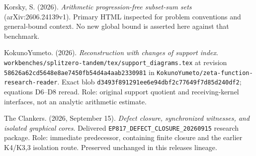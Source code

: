 Korsky, S. (2026). \emph{Arithmetic progression-free subset-sum sets} (arXiv:2606.24139v1). Primary HTML inspected for problem conventions and general-bound context. No new global bound is asserted here against that benchmark.

KokunoYumeto. (2026). \emph{Reconstruction with changes of support index}. \nolinkurl{workbenches/splitzero-tandem/tex/support_diagrams.tex} at revision \nolinkurl{58626a62cd5648e8ae7450fb54d4a4aab2330981} in \nolinkurl{KokunoYumeto/zeta-function-research-reader}. Exact blob \nolinkurl{d3493f891291ee6e94dbf2c77649f7d85d240df2}; equations D6--D8 reread. Role: original support quotient and receiving-kernel interfaces, not an analytic arithmetic estimate.

The Clankers. (2026, September 15). \emph{Defect closure, synchronized witnesses, and isolated graphical cores}. Delivered \nolinkurl{EP817_DEFECT_CLOSURE_20260915} research package. Role: immediate predecessor, containing finite closure and the earlier K4/K3,3 isolation route. Preserved unchanged in this release\textquotesingle s lineage.
